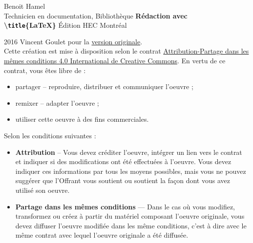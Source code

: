 
\begin{frame}
	
	\tiny
	Benoit Hamel \\
	Technicien en documentation, Bibliothèque
	\vfill
	{\Huge\bfseries Rédaction avec \\
	\textbackslash \texttt{title}\{\textrm{\LaTeX}\}}
	\vfill
	Édition HEC Montréal
	
\end{frame}


\begin{frame}
	
	\tiny
	{\faCopyright} 2016 Vincent Goulet pour la
	\href{https://ctan.org/pkg/formation-latex-ul}{version originale}.
	\\[2ex]
	{\faCreativeCommons} Cette création est mise à disposition selon le contrat
	\href{http://creativecommons.org/licenses/by-sa/4.0/deed.fr}%
	{Attribution-Partage dans les mêmes conditions 4.0 International de Creative Commons}.
	En vertu de ce contrat, vous êtes libre de :
	
	\begin{itemize}
		\item partager -- reproduire, distribuer et communiquer l’oeuvre ;
		\item remixer -- adapter l’oeuvre ;
		\item utiliser cette oeuvre à des fins commerciales.
	\end{itemize}

	Selon les conditions suivantes :
	
	\begin{itemize}
		\item \textbf{Attribution} -- Vous devez créditer l’oeuvre, intégrer un lien vers le contrat et indiquer si des modifications ont été effectuées	à l’oeuvre. Vous devez indiquer ces informations par tous les moyens possibles, mais vous ne pouvez suggérer que l’Offrant vous soutient ou soutient la façon dont vous avez utilisé son oeuvre.
		\item \textbf{Partage dans les mêmes conditions} — Dans le cas où vous modifiez, transformez ou créez à partir du matériel composant l’oeuvre originale, vous devez diffuser l’oeuvre modifiée dans les même conditions, c’est à dire avec le même contrat avec	lequel l’oeuvre originale a été diffusée.
	\end{itemize}

\end{frame}